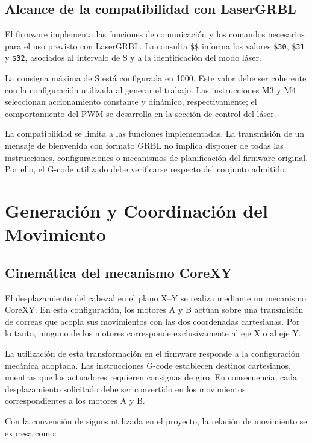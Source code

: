 \documentclass[blue,fullpaper]{ludusofficial}  %
\begin{document}
\subsection{Alcance de la compatibilidad con LaserGRBL}

El firmware implementa las funciones de comunicación
y los comandos necesarios para el uso previsto
con LaserGRBL. La consulta \texttt{\$\$} informa
los valores \texttt{\$30}, \texttt{\$31} y
\texttt{\$32}, asociados al intervalo de S y
a la identificación del modo láser.

La consigna máxima de S está configurada en 1000.
Este valor debe ser coherente con la configuración
utilizada al generar el trabajo. Las instrucciones M3
y M4 seleccionan accionamiento constante y dinámico,
respectivamente; el comportamiento del PWM se desarrolla
en la sección de control del láser.

La compatibilidad se limita a las funciones implementadas.
La transmisión de un mensaje de bienvenida con formato
GRBL no implica disponer de todas las instrucciones,
configuraciones o mecanismos de planificación del
firmware original. Por ello, el G-code utilizado
debe verificarse respecto del conjunto admitido.


\section{Generación y Coordinación del Movimiento}

\subsection{Cinemática del mecanismo CoreXY}

El desplazamiento del cabezal en el plano X--Y se
realiza mediante un mecanismo CoreXY. En esta
configuración, los motores A y B actúan sobre
una transmisión de correas que acopla sus movimientos
con las dos coordenadas cartesianas. Por lo tanto,
ninguno de los motores corresponde exclusivamente
al eje X o al eje Y.

La utilización de esta transformación en el firmware
responde a la configuración mecánica adoptada.
Las instrucciones G-code establecen destinos
cartesianos, mientras que los actuadores requieren
consignas de giro. En consecuencia, cada desplazamiento
solicitado debe ser convertido en los movimientos
correspondientes a los motores A y B.

Con la convención de signos utilizada en el proyecto,
la relación de movimiento se expresa como:
\end{document}
